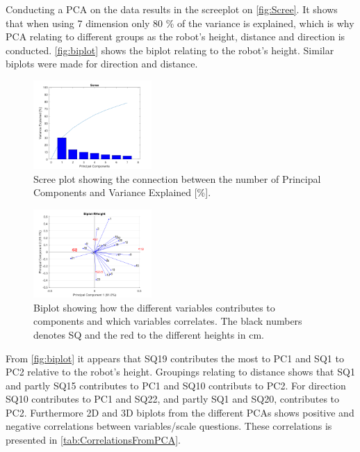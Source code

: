\noindent
Conducting a PCA on the data results in the screeplot on \autoref{fig:Scree}. It shows that when using 7 dimension only 80 \% of the variance is explained, which is why PCA relating to different groups as the robot's height, distance and direction is conducted. \autoref{fig:biplot} shows the biplot relating to the robot's height. Similar biplots were made for direction and distance.
%
\begin{figure}
	\centering
	\includegraphics[width = 0.40\textwidth]{Figure/Scree.png}
	\setlength{} 
	\caption{Scree plot showing the connection between the number of Principal Components and Variance Explained [\%].}
	\label{fig:Scree}
\end{figure}
\noindent
%
\begin{figure}
	\centering
	\includegraphics[width = 0.40\textwidth]{Figure/RHeight-Biplot.png}
	\setlength{} 
	\caption{Biplot showing how the different variables contributes to components and which variables correlates. The black numbers denotes SQ and the red to the different heights in cm.}
	\label{fig:biplot}
\end{figure}
\noindent
%
From \autoref{fig:biplot} it appears that SQ19 contributes the most to PC1 and SQ1 to PC2 relative to the robot's height. Groupings relating to distance shows that SQ1 and partly SQ15 contributes to PC1 and SQ10 contributs to PC2. For direction SQ10 contributes to PC1 and SQ22, and partly SQ1 and SQ20, contributes to PC2. Furthermore 2D and 3D biplots from the different PCAs shows positive and negative correlations between variables/scale questions. These correlations is presented in \autoref{tab:CorrelationsFromPCA}.
%
